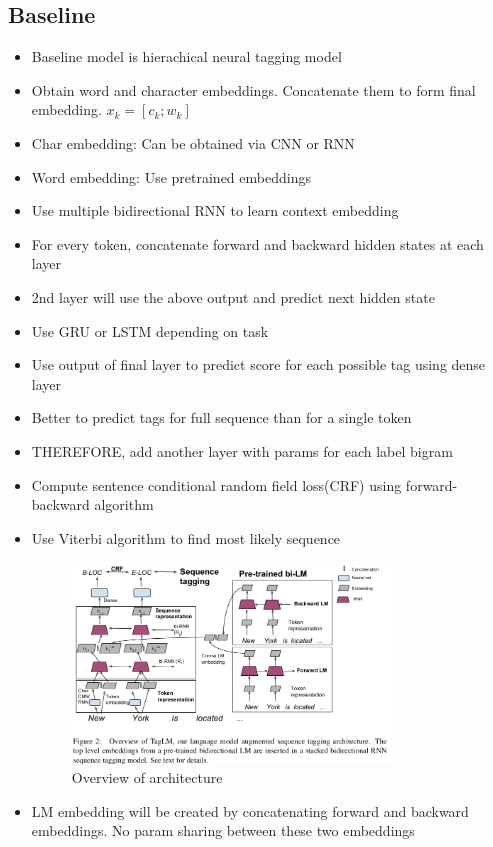 \documentclass[a4paper]{article}
\begin{document}
\subsection{Baseline}
\begin{itemize}
    \item Baseline model is hierachical neural tagging model
    \item Obtain word and character embeddings. Concatenate them to form final embedding. $x_k = [c_k;w_k]$
    \item Char embedding: Can be obtained via CNN or RNN
    \item Word embedding: Use pretrained embeddings
    \item Use multiple bidirectional RNN to learn context embedding
    \item For every token, concatenate forward and backward hidden states at each layer
    \item 2nd layer will use the above output and predict next hidden state
    \item Use GRU or LSTM depending on task
    \item Use output of final layer to predict score for each possible tag using dense layer
    \item Better to predict tags for full sequence than for a single token
    \item THEREFORE, add another layer with params for each label bigram
    \item Compute sentence conditional random field loss(CRF) using forward-backward algorithm
    \item Use Viterbi algorithm to find most likely sequence
    \begin{figure}[H]
        \centering
        \includegraphics[width=0.8\textwidth]{overview}
        \caption{Overview of architecture}
        \label{fig:overview}
    \end{figure}
    \item LM embedding will be created by concatenating forward and backward embeddings. No param sharing between these two embeddings
\end{itemize}
\end{document}
